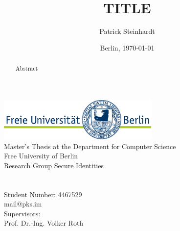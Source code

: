 \documentclass[12pt,a4paper,english]{article}
\title{TITLE}
\author{Patrick Steinhardt}
\date{Berlin, \today}
\begin{document}
    \begin{titlepage}
        \makeatletter
        \begin{center}
            \includegraphics[width=0.6\textwidth]{../resources/fu-logo.pdf}\\
            {\normalsize Master's Thesis at the Department for Computer Science\\Free University of Berlin\\Research Group Secure Identities}\\[8ex]
            {\Large \@title}\\[6ex]
            {\large \@author}\\
            {\normalsize Student Number: 4467529}\\
            {\normalsize mail@pks.im}\\[4ex]
            {\normalsize Supervisors:\\Prof. Dr.-Ing. Volker Roth}\\[4ex]
            {\normalsize \@date}
        \end{center}
        \makeatother

        \vfill{}
        \begin{abstract}

            Abstract

        \end{abstract}
        \vfill{}
    \end{titlepage}

    
    \clearpage

    \tableofcontents
    \clearpage
    \listoffigures
    \clearpage
    \lstlistoflistings
    \clearpage

    \pagestyle{fancy}
    \setcounter{page}{1}

    \clearpage
    \nocite{*}
    
\end{document}

